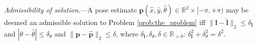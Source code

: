 \begin{definition}
  \label{def:definition_7} \textit{Admissibility of solution}.---A pose estimate
  $\hat{\bm{p}}(\hat{x},\hat{y},\hat{\theta}) \in \mathbb{R}^2 \times [-\pi,+\pi)$
  may be deemed an admissible solution to Problem \ref{prob:the_problem} iff
  $\|\bm{l}-\hat{\bm{l}}\|_2 \leq \delta_{\bm{l}}$ and
  $|\theta-\hat{\theta}| \leq \delta_\theta$ and
  $\|\bm{p}-\hat{\bm{p}}\|_2 \leq \delta$, where
  $\delta_{\bm{l}}, \delta_\theta, \delta \in \mathbb{R}_{> 0}$:
  $\delta_{\bm{l}}^2 + \delta_{\theta}^2 = \delta^2$.
\end{definition}
